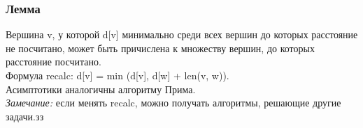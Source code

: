 \documentclass[12pt, a4paper]{article}
\begin{document}
    \subsubsection*{Лемма}
    Вершина v, у которой d[v] минимально среди всех вершин до которых расстояние не посчитано, 
    может быть причислена к множеству вершин, до которых расстояние посчитано.\\
    Формула recalc: d[v] = min (d[v], d[w] + len(v, w)).\\
    Асимптотики аналогичны алгоритму Прима.\\
    \textit{Замечание:} если менять recalc, можно получать алгоритмы, решающие другие задачи.зз
\end{document}
